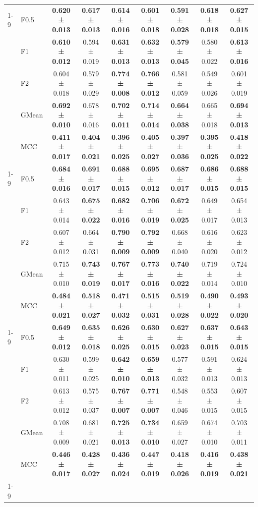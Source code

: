 \begin{table}[H]
{\begin{tabular}{llccccccc}
\cline{1-9}
\multirow[t]{5}{*}{TabM} & F0.5 & \textbf{0.620 ± 0.013} & \textbf{0.617 ± 0.013} & \textbf{0.614 ± 0.016} & \textbf{0.601 ± 0.018} & \textbf{0.591 ± 0.028} & \textbf{0.618 ± 0.018} & \textbf{0.627 ± 0.015} \\
 & F1 & \textbf{0.610 ± 0.012} & 0.594 ± 0.019 & \textbf{0.631 ± 0.013} & \textbf{0.632 ± 0.013} & \textbf{0.579 ± 0.045} & 0.580 ± 0.022 & \textbf{0.613 ± 0.016} \\
 & F2 & 0.604 ± 0.018 & 0.579 ± 0.029 & \textbf{0.774 ± 0.008} & \textbf{0.766 ± 0.012} & 0.581 ± 0.059 & 0.549 ± 0.026 & 0.601 ± 0.019 \\
 & GMean & \textbf{0.692 ± 0.010} & 0.678 ± 0.016 & \textbf{0.702 ± 0.011} & \textbf{0.714 ± 0.014} & \textbf{0.664 ± 0.038} & 0.665 ± 0.018 & \textbf{0.694 ± 0.013} \\
 & MCC & \textbf{0.411 ± 0.017} & \textbf{0.404 ± 0.021} & \textbf{0.396 ± 0.025} & \textbf{0.405 ± 0.027} & \textbf{0.397 ± 0.036} & \textbf{0.395 ± 0.025} & \textbf{0.418 ± 0.022} \\
\cline{1-9}
\multirow[t]{5}{*}{TabPFN} & F0.5 & \textbf{0.684 ± 0.016} & \textbf{0.691 ± 0.017} & \textbf{0.688 ± 0.015} & \textbf{0.695 ± 0.012} & \textbf{0.687 ± 0.017} & \textbf{0.686 ± 0.015} & \textbf{0.688 ± 0.015} \\
 & F1 & 0.643 ± 0.014 & \textbf{0.675 ± 0.022} & \textbf{0.682 ± 0.016} & \textbf{0.706 ± 0.019} & \textbf{0.672 ± 0.025} & 0.649 ± 0.017 & 0.654 ± 0.013 \\
 & F2 & 0.607 ± 0.012 & 0.664 ± 0.031 & \textbf{0.790 ± 0.009} & \textbf{0.792 ± 0.009} & 0.668 ± 0.040 & 0.616 ± 0.020 & 0.623 ± 0.012 \\
 & GMean & 0.715 ± 0.010 & \textbf{0.743 ± 0.019} & \textbf{0.767 ± 0.017} & \textbf{0.773 ± 0.016} & \textbf{0.740 ± 0.022} & 0.719 ± 0.014 & 0.724 ± 0.010 \\
 & MCC & \textbf{0.484 ± 0.021} & \textbf{0.518 ± 0.027} & \textbf{0.471 ± 0.032} & \textbf{0.515 ± 0.031} & \textbf{0.519 ± 0.028} & \textbf{0.490 ± 0.022} & \textbf{0.493 ± 0.020} \\
\cline{1-9}
\multirow[t]{5}{*}{XGBoost} & F0.5 & \textbf{0.649 ± 0.012} & \textbf{0.635 ± 0.018} & \textbf{0.626 ± 0.025} & \textbf{0.630 ± 0.015} & \textbf{0.627 ± 0.023} & \textbf{0.637 ± 0.015} & \textbf{0.643 ± 0.015} \\
 & F1 & 0.630 ± 0.011 & 0.599 ± 0.025 & \textbf{0.642 ± 0.010} & \textbf{0.659 ± 0.013} & 0.577 ± 0.032 & 0.591 ± 0.013 & 0.624 ± 0.013 \\
 & F2 & 0.613 ± 0.012 & 0.575 ± 0.037 & \textbf{0.767 ± 0.007} & \textbf{0.771 ± 0.007} & 0.548 ± 0.046 & 0.553 ± 0.015 & 0.607 ± 0.015 \\
 & GMean & 0.708 ± 0.009 & 0.681 ± 0.021 & \textbf{0.725 ± 0.013} & \textbf{0.734 ± 0.010} & 0.659 ± 0.027 & 0.674 ± 0.010 & 0.703 ± 0.011 \\
 & MCC & \textbf{0.446 ± 0.017} & \textbf{0.428 ± 0.027} & \textbf{0.436 ± 0.024} & \textbf{0.447 ± 0.019} & \textbf{0.418 ± 0.026} & \textbf{0.416 ± 0.019} & \textbf{0.438 ± 0.021} \\
\cline{1-9}
\bottomrule
\end{tabular}
    }
\end{table}
